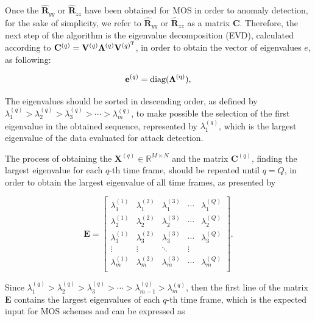 \documentclass[twocolumn]{svjour3}          	%
\begin{document}
Once the $\mathbf{\hat{R}}_{yy}$ or $\mathbf{\hat{R}}_{zz}$ have been obtained for MOS in order to anomaly detection, for the sake of simplicity, we refer to $\mathbf{\hat{R}}_{yy}$ or $\mathbf{\hat{R}}_{zz}$ as a matrix $\mathbf{C}$. Therefore, the next step of the algorithm is the eigenvalue decomposition (EVD), calculated according to $\mathbf{C}^{(q)} = \mathbf{V}^{(q)}\mathbf{\Lambda}^{(q)}\mathbf{V}^{(q)^{\rm T}}$, in order to obtain the vector of eigenvalues $e$, as following:

\begin{equation}\label{eq:eq07}
\mathbf{e}^{(q)} = \rm diag(\mathbf{\Lambda}^{(q)}),
\end{equation}

The eigenvalues should be sorted in descending order, as defined by $\lambda_{1}^{(q)} > \lambda_{2}^{(q)} > \lambda_{3}^{(q)} > \cdots > \lambda_{m}^{(q)}$, to make possible the selection of the first eigenvalue in the obtained sequence, represented by $\lambda_{1}^{(q)}$, which is the largest eigenvalue of the data evaluated for attack detection.

The process of obtaining the $\mathbf{X}^{(q)} \in \mathbb{R}^{M\times{N}}$ and the matrix $\mathbf{C}^{(q)}$, finding the largest eigenvalue for each $q$-th time frame, should be repeated until $q = Q$, in order to obtain the largest eigenvalue of all time frames, as presented by 

\begin{equation}\label{eq:eq08}
\mathbf{E} =
\begin{bmatrix}
  \lambda_1^{(1)} & \lambda_1^{(2)} & \lambda_1^{(3)} & \cdots & \lambda_1^{(Q)} \\
  \lambda_2^{(1)} & \lambda_2^{(2)} & \lambda_2^{(3)} & \cdots & \lambda_2^{(Q)} \\
  \lambda_3^{(1)} & \lambda_3^{(2)} & \lambda_3^{(3)} & \cdots & \lambda_3^{(Q)} \\
  \vdots & \vdots & \ddots & \vdots  \\
  \lambda_m^{(1)} & \lambda_m^{(2)} & \lambda_m^{(3)} & \cdots & \lambda_m^{(Q)} \\
\end{bmatrix}.
\end{equation}

Since $\lambda_1^{(q)} > \lambda_2^{(q)} > \lambda_3^{(q)} > \cdots > \lambda_{m-1}^{(q)} > \lambda_m^{(q)}$, then the first line of the matrix $\mathbf{E}$ contains the largest eigenvalues of each $q$-th time frame, which is the expected input for MOS schemes and can be expressed as 
\end{document}
